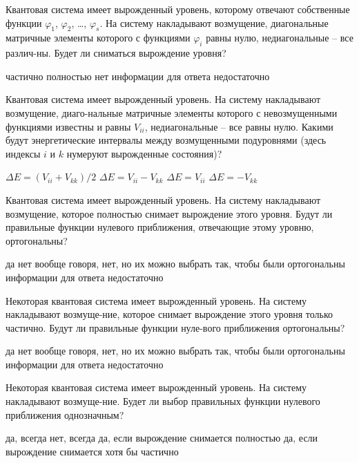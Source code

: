 \documentclass[11pt,a4paper]{exam}
\begin{document}
\begin{questions}
\question Квантовая система имеет вырожденный уровень, которому отвечают собственные функции ${\varphi _1}$, ${\varphi _2}$, …, ${\varphi _s}$. На систему накладывают возмущение, диагональные матричные элементы которого с функциями ${\varphi _i}$ равны нулю, недиагональные – все различ-ны. Будет ли сниматься вырождение уровня?
\begin{choices}
\choice частично    
\choice полностью      
\choice нет      
\choice информации для ответа недостаточно
\end{choices}

\question Квантовая система имеет вырожденный уровень. На систему накладывают возмущение, диаго-нальные матричные элементы которого с невозмущенными функциями известны и равны ${V_{ii}}$, недиагональные – все равны нулю. Какими будут энергетические интервалы между возмущенными подуровнями (здесь индексы $i$ и $k$ нумеруют вырожденные состояния)?
\begin{choices}
\choice $\Delta E = \left( {{V_{ii}} + {V_{kk}}} \right)/2$   
\choice $\Delta E = {V_{ii}} - {V_{kk}}$ 
\choice $\Delta E = {V_{ii}}$   
\choice $\Delta E =  - {V_{kk}}$ 
\end{choices}

\question Квантовая система имеет вырожденный уровень. На систему накладывают возмущение, которое полностью снимает вырождение этого уровня. Будут ли правильные функции нулевого приближения, отвечающие этому уровню, ортогональны?
\begin{choices}
\choice да
\choice нет
\choice вообще говоря, нет, но их можно выбрать так, чтобы были ортогональны 
\choice информации для ответа недостаточно
\end{choices}

\question Некоторая квантовая система имеет вырожденный уровень. На систему накладывают возмуще-ние, которое снимает вырождение этого уровня только частично. Будут ли правильные функции нуле-вого приближения ортогональны?
\begin{choices}
\choice да
\choice нет
\choice вообще говоря, нет, но их можно выбрать так, чтобы были ортогональны
\choice информации для ответа недостаточно
\end{choices}

\question Некоторая квантовая система имеет вырожденный уровень. На систему накладывают возмуще-ние. Будет ли выбор правильных функции нулевого приближения однозначным?
\begin{choices}
\choice да, всегда
\choice нет, всегда
\choice да, если вырождение снимается полностью
\choice да, если вырождение снимается хотя бы частично
\end{choices}


\end{questions}
\end{document}
